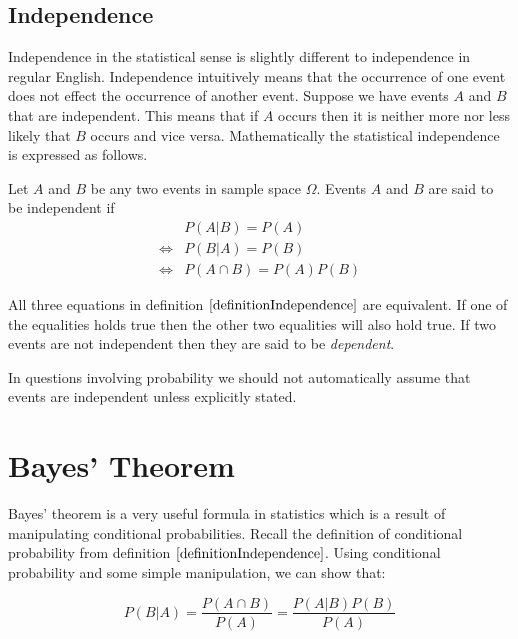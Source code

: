 \subsection{Independence}

Independence in the statistical sense is slightly different to independence in regular English.
Independence intuitively means that the occurrence of one event does not effect the occurrence of another event.
Suppose we have events $A$ and $B$ that are independent. 
This means that if $A$ occurs then it is neither more nor less likely that $B$ occurs and vice versa.
Mathematically the statistical independence is expressed as follows.

\begin{definition}[Independence]\label{definitionIndependence}
Let $A$ and $B$ be any two events in sample space $\Omega$.
Events $A$ and $B$ are said to be independent if
	\begin{align}
						& P(A|B) = P(A)\\[0.5em]
		\Longleftrightarrow	& P(B|A) = P(B)\\[0.5em]
		\Longleftrightarrow	& P(A \cap B) = P(A) P(B)
	\end{align}
\end{definition}

All three equations in definition $\ref{definitionIndependence}$ are equivalent.
If one of the equalities holds true then the other two equalities will
also hold true.
If two events are not independent then they are said to be \textit{dependent}.

\begin{nt}
In questions involving probability we should not automatically assume that events are independent unless explicitly stated.
\end{nt}



\section{Bayes' Theorem}

Bayes' theorem is a very useful formula in statistics which is a result of manipulating conditional probabilities.
Recall the definition of conditional probability from 
definition $\ref{definitionIndependence}$.
Using conditional probability and some simple manipulation, we can show that:

	\begin{equation}
	P(B | A) = \frac{ P(A \cap B) }{ P(A) } = \frac{ P(A|B)  P(B) }{P(A)}
	\end{equation}

